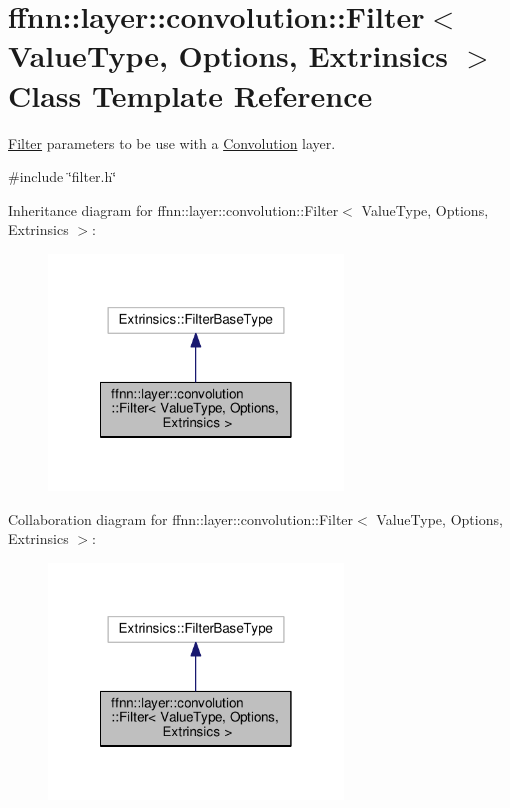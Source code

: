 \hypertarget{classffnn_1_1layer_1_1convolution_1_1_filter}{\section{ffnn\-:\-:layer\-:\-:convolution\-:\-:Filter$<$ Value\-Type, Options, Extrinsics $>$ Class Template Reference}
\label{classffnn_1_1layer_1_1convolution_1_1_filter}
}


\hyperlink{classffnn_1_1layer_1_1convolution_1_1_filter}{Filter} parameters to be use with a \hyperlink{classffnn_1_1layer_1_1_convolution}{Convolution} layer.  




{\ttfamily \#include \char`\"{}filter.\-h\char`\"{}}



Inheritance diagram for ffnn\-:\-:layer\-:\-:convolution\-:\-:Filter$<$ Value\-Type, Options, Extrinsics $>$\-:
\nopagebreak
\begin{figure}[H]
\begin{center}
\leavevmode
\includegraphics[width=222pt]{classffnn_1_1layer_1_1convolution_1_1_filter__inherit__graph}
\end{center}
\end{figure}


Collaboration diagram for ffnn\-:\-:layer\-:\-:convolution\-:\-:Filter$<$ Value\-Type, Options, Extrinsics $>$\-:
\nopagebreak
\begin{figure}[H]
\begin{center}
\leavevmode
\includegraphics[width=222pt]{classffnn_1_1layer_1_1convolution_1_1_filter__coll__graph}
\end{center}
\end{figure}
